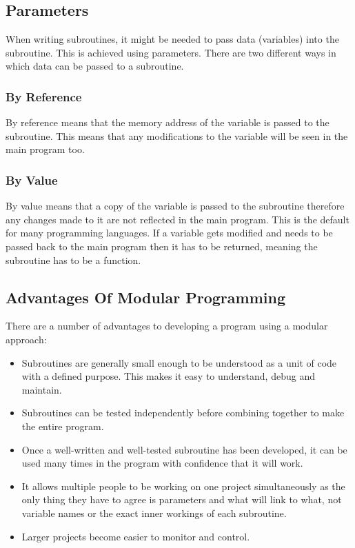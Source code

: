 \documentclass[a4paper,11pt, twocolumn]{article}
\begin{document}
\subsection{Parameters}
When writing subroutines, it might be needed to pass data (variables) into the subroutine. This is achieved using parameters. There are two different ways in which data can be passed to a subroutine.
\subsubsection{By Reference}
By reference means that the memory address of the variable is passed to the subroutine. This means that any modifications to the variable will be seen in the main program too.
\subsubsection{By Value}
By value means that a copy of the variable is passed to the subroutine therefore any changes made to it are not reflected in the main program. This is the default for many programming languages. If a variable gets modified and needs to be passed back to the main program then it has to be returned, meaning the subroutine has to be a function.
\subsection{Advantages Of Modular Programming}
There are a number of advantages to developing a program using a modular approach:
\begin{itemize}
    \item Subroutines are generally small enough to be understood as a unit of code with a defined purpose. This makes it easy to understand, debug and maintain.
    \item Subroutines can be tested independently before combining together to make the entire program.
    \item Once a well-written and well-tested subroutine has been developed, it can be used many times in the program with confidence that it will work.
    \item It allows multiple people to be working on one project simultaneously as the only thing they have to agree is parameters and what will link to what, not variable names or the exact inner workings of each subroutine.
    \item Larger projects become easier to monitor and control.
\end{itemize}
\end{document}
